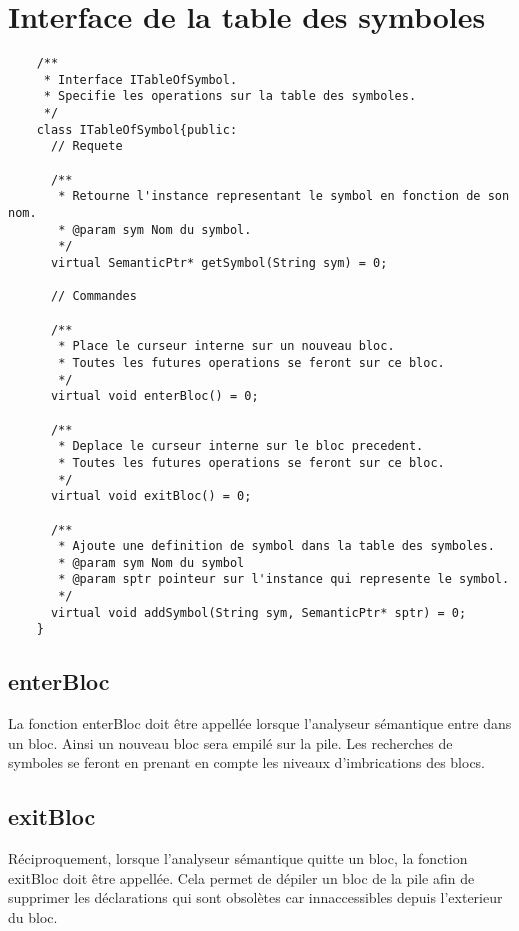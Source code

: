 \documentclass{../../res/univ-projet}
\begin{document}

 \section{Interface de la table des symboles}
    \begin{verbatim}
    /**
     * Interface ITableOfSymbol.
     * Specifie les operations sur la table des symboles.
     */
    class ITableOfSymbol{public:
      // Requete

      /**
       * Retourne l'instance representant le symbol en fonction de son nom.
       * @param sym Nom du symbol.
       */
      virtual SemanticPtr* getSymbol(String sym) = 0;

      // Commandes

      /**
       * Place le curseur interne sur un nouveau bloc.
       * Toutes les futures operations se feront sur ce bloc.
       */
      virtual void enterBloc() = 0;

      /**
       * Deplace le curseur interne sur le bloc precedent.
       * Toutes les futures operations se feront sur ce bloc.
       */
      virtual void exitBloc() = 0;

      /**
       * Ajoute une definition de symbol dans la table des symboles.
       * @param sym Nom du symbol
       * @param sptr pointeur sur l'instance qui represente le symbol.
       */
      virtual void addSymbol(String sym, SemanticPtr* sptr) = 0;
    }
    \end{verbatim}

  \subsection{enterBloc}
    La fonction enterBloc doit être appellée lorsque l'analyseur sémantique entre dans un bloc. Ainsi un nouveau bloc sera empilé sur la pile. Les recherches de symboles se feront en prenant en compte les niveaux d'imbrications des blocs.
  \subsection{exitBloc}
   Réciproquement, lorsque l'analyseur sémantique quitte un bloc, la fonction exitBloc doit être appellée. Cela permet de dépiler un bloc de la pile afin de supprimer les déclarations qui sont obsolètes car innaccessibles depuis l'exterieur du bloc.
\end{document}
